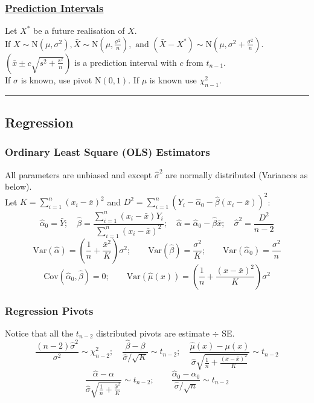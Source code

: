 \documentclass{article}
\begin{document}
\begin{multicols*}{2}
\subsubsection*{\underline{Prediction Intervals}}
Let $X^{*}$ be a future realisation of $X$.\\
If $X \sim \mbox{N}(\mu, \sigma^{2}), \bar{X} \sim \mbox{N}(\mu, \frac{\sigma^{2}}{n}), \mbox{ and } (\bar{X}-X^{*}) \sim \mbox{N}(\mu, \sigma^{2} + \frac{\sigma^{2}}{n})$.\\
$\left( \bar{x} \pm c \sqrt{s^{2} + \frac{s^{2}}{n}} \right)$ is a prediction interval with $c$ from $t_{n-1}$.\\
If $\sigma$ is known, use pivot $\mbox{N}(0, 1)$. If $\mu$ is known use $\chi^{2}_{n-1}$.

\noindent\rule{\linewidth}{0.25pt}
\subsection*{Regression}
\subsubsection*{Ordinary Least Square (OLS) Estimators}
All parameters are unbiased and except $\hat{\sigma}^{2}$ are normally distributed (Variances as below).\\
Let $K = \sum_{i=1}^{n}(x_{i}-\bar{x})^{2}$ and $D^{2} = \sum_{i=1}^{n}(Y_{i} - \hat{\alpha}_{0} - \hat{\beta}(x_{i} - \bar{x}))^{2}$:
$$\hat{\alpha}_{0} = \bar{Y}; \quad \hat{\beta} = \frac{\sum_{i=1}^{n}(x_{i}-\bar{x})Y_{i}}{\sum_{i=1}^{n}(x_{i}-\bar{x})^{2}}; \quad \hat{\alpha} = \hat{\alpha}_{0} - \hat{\beta}\bar{x}; \quad \hat{\sigma}^{2} = \frac{D^{2}}{n-2}$$
$$\mbox{Var}(\hat{\alpha}) = \left( \frac{1}{n} + \frac{\bar{x}^{2}}{K} \right) \sigma^{2}; \qquad \mbox{Var}(\hat{\beta}) = \frac{\sigma^{2}}{K}; \qquad \mbox{Var}(\hat{\alpha}_{0}) = \frac{\sigma^{2}}{n}$$
$$\mbox{Cov}(\hat{\alpha}_{0}, \hat{\beta}) = 0; \qquad \mbox{Var}(\hat{\mu}(x)) = \left( \frac{1}{n} + \frac{(x-\bar{x})^{2}}{K} \right) \sigma^{2}$$
\subsubsection*{Regression Pivots}
Notice that all the $t_{n-2}$ distributed pivots are estimate $\div$ SE.
$$\frac{(n-2)\hat{\sigma}^{2}}{\sigma^{2}} \sim \chi^{2}_{n-2}; \quad \frac{\hat{\beta} - \beta}{\hat{\sigma} / \sqrt{K}} \sim t_{n-2}; \quad \frac{\hat{\mu}(x) - \mu(x)}{\hat{\sigma} \sqrt{\frac{1}{n} + \frac{(x - \bar{x})^{2}}{K}}} \sim t_{n-2}$$
$$\frac{\hat{\alpha} - \alpha}{\hat{\sigma} \sqrt{\frac{1}{n} + \frac{\bar{x}^{2}}{K}}} \sim t_{n-2}; \qquad \frac{\hat{\alpha}_{0} - \alpha_{0}}{\hat{\sigma} / \sqrt{n}} \sim t_{n-2}$$


\end{multicols*}
\end{document}
